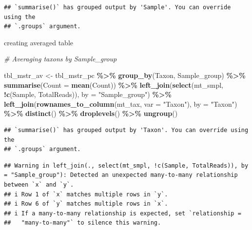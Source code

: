 \documentclass[
]{article}
\newenvironment{Shaded}{\begin{snugshade}}{\end{snugshade}}
\newcommand{\AttributeTok}[1]{\textcolor[rgb]{0.13,0.29,0.53}{#1}}
\newcommand{\CommentTok}[1]{\textcolor[rgb]{0.56,0.35,0.01}{\textit{#1}}}
\newcommand{\FunctionTok}[1]{\textcolor[rgb]{0.13,0.29,0.53}{\textbf{#1}}}
\newcommand{\NormalTok}[1]{#1}
\newcommand{\OtherTok}[1]{\textcolor[rgb]{0.56,0.35,0.01}{#1}}
\newcommand{\SpecialCharTok}[1]{\textcolor[rgb]{0.81,0.36,0.00}{\textbf{#1}}}
\newcommand{\StringTok}[1]{\textcolor[rgb]{0.31,0.60,0.02}{#1}}
\begin{document}
\begin{verbatim}
## `summarise()` has grouped output by 'Sample'. You can override using the
## `.groups` argument.
\end{verbatim}

creating averaged table

\begin{Shaded}
\begin{Highlighting}[]
\CommentTok{\# Averaging taxons by Sample\_group}

\NormalTok{tbl\_mstr\_av }\OtherTok{\textless{}{-}}\NormalTok{ tbl\_mstr\_pc }\SpecialCharTok{\%\textgreater{}\%}
  \FunctionTok{group\_by}\NormalTok{(Taxon, Sample\_group) }\SpecialCharTok{\%\textgreater{}\%}
  \FunctionTok{summarise}\NormalTok{(}\AttributeTok{Count =} \FunctionTok{mean}\NormalTok{(Count)) }\SpecialCharTok{\%\textgreater{}\%}
  \FunctionTok{left\_join}\NormalTok{(}\FunctionTok{select}\NormalTok{(mt\_smpl, }\SpecialCharTok{!}\FunctionTok{c}\NormalTok{(Sample, TotalReads)), }\AttributeTok{by =} \StringTok{"Sample\_group"}\NormalTok{) }\SpecialCharTok{\%\textgreater{}\%}
  \FunctionTok{left\_join}\NormalTok{(}\FunctionTok{rownames\_to\_column}\NormalTok{(mt\_tax, }\AttributeTok{var =} \StringTok{"Taxon"}\NormalTok{), }\AttributeTok{by =} \StringTok{"Taxon"}\NormalTok{) }\SpecialCharTok{\%\textgreater{}\%}
  \FunctionTok{distinct}\NormalTok{() }\SpecialCharTok{\%\textgreater{}\%}
  \FunctionTok{droplevels}\NormalTok{() }\SpecialCharTok{\%\textgreater{}\%}
  \FunctionTok{ungroup}\NormalTok{()}
\end{Highlighting}
\end{Shaded}

\begin{verbatim}
## `summarise()` has grouped output by 'Taxon'. You can override using the
## `.groups` argument.
\end{verbatim}

\begin{verbatim}
## Warning in left_join(., select(mt_smpl, !c(Sample, TotalReads)), by = "Sample_group"): Detected an unexpected many-to-many relationship between `x` and `y`.
## i Row 1 of `x` matches multiple rows in `y`.
## i Row 6 of `y` matches multiple rows in `x`.
## i If a many-to-many relationship is expected, set `relationship =
##   "many-to-many"` to silence this warning.
\end{verbatim}
\end{document}
